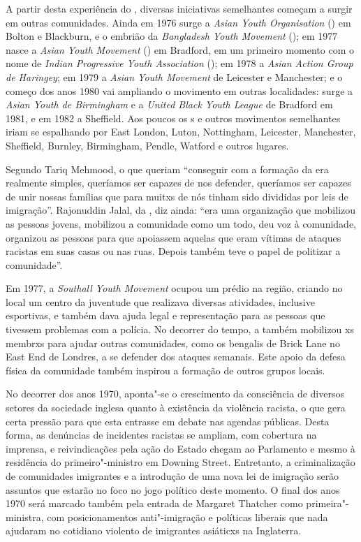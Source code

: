 A partir desta experiência do , diversas iniciativas semelhantes começam a surgir em outras comunidades. Ainda em 1976 surge a \emph{Asian Youth Organisation} () em Bolton e Blackburn, e o embrião da \emph{Bangladesh Youth Movement} (); em 1977 nasce a \emph{Asian Youth Movement} () em Bradford, em um primeiro momento com o nome de \emph{Indian Progressive Youth Association} (); em 1978 a \emph{Asian Action Group de Haringey}; em 1979 a \emph{Asian Youth Movement} de Leicester e Manchester; e o começo dos anos 1980 vai ampliando o movimento em outras localidades: surge a \emph{Asian Youth de Birmingham} e a \emph{United Black Youth League} de Bradford em 1981, e em 1982 a  Sheffield. Aos poucos os s e outros movimentos semelhantes iriam se espalhando por East London, Luton, Nottingham, Leicester, Manchester, Sheffield, Burnley, Birmingham, Pendle, Watford e outros lugares.

Segundo Tariq Mehmood, o que queriam ``conseguir com a formação da  era realmente simples, queríamos ser capazes de nos defender, queríamos ser capazes de unir nossas famílias que para muitxs de nós tinham sido divididas por leis de imigração''. Rajonuddin Jalal, da , diz ainda: ``era uma organização que mobilizou as pessoas jovens, mobilizou a comunidade como um todo, deu voz à comunidade, organizou as pessoas para que apoiassem aquelas que eram vítimas de ataques racistas em suas casas ou nas ruas. Depois também teve o papel de politizar a comunidade''.

Em 1977, a \emph{Southall Youth Movement} ocupou um prédio na região, criando no local um centro da juventude que realizava diversas atividades, inclusive esportivas, e também dava ajuda legal e representação para as pessoas que tivessem problemas com a polícia. No decorrer do tempo, a  também mobilizou xs membrxs para ajudar outras comunidades, como os bengalis de Brick Lane no East End de Londres, a se defender dos ataques semanais. Este apoio da defesa física da comunidade também inspirou a formação de outros grupos locais.

No decorrer dos anos 1970, aponta"-se o crescimento da consciência de diversos setores da sociedade inglesa quanto à existência da violência racista, o que gera certa pressão para que esta entrasse em debate nas agendas públicas. Desta forma, as denúncias de incidentes racistas se ampliam, com cobertura na imprensa, e reivindicações pela ação do Estado chegam ao Parlamento e mesmo à residência do primeiro"-ministro em Downing Street. Entretanto, a criminalização de comunidades imigrantes e a introdução de uma nova lei de imigração serão assuntos que estarão no foco no jogo político deste momento. O final dos anos 1970 será marcado também pela entrada de Margaret Thatcher como primeira"-ministra, com posicionamentos anti"-imigração e políticas liberais que nada ajudaram no cotidiano violento de imigrantes asiáticxs na Inglaterra.

